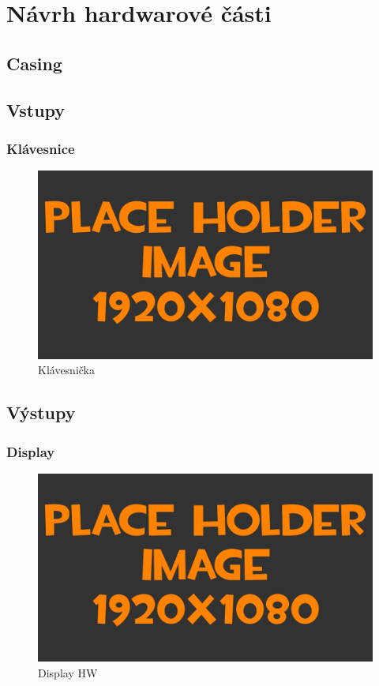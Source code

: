 
\section{Návrh hardwarové části}
\subsection{Casing}

\subsection{Vstupy}
\subsubsection{Klávesnice}
\begin{figure}[h!]
	\centering
	\includegraphics[width=\textwidth]{pictures/placeHolderFHD.png}
    	\caption{Klávesnička}
   	\label{fig:keyborad}
\end{figure}

\newpage
\subsection{Výstupy}
\subsubsection{Display}
\begin{figure}[h!]
	\centering
	\includegraphics[width=\textwidth]{pictures/placeHolderFHD.png}
    	\caption{Display HW}
   	\label{fig:displayHW}
\end{figure}

